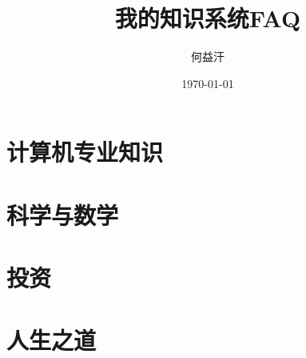 

\title{我的知识系统FAQ}
\author{何益汗}
\date{\today}



\maketitle

\tableofcontents

\part{计算机专业知识}








\part{科学与数学}



\part{投资}



\part{人生之道}








